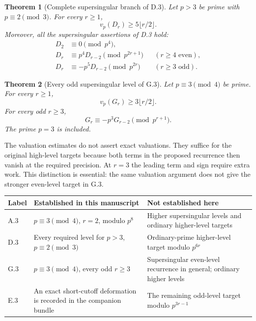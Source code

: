 \documentclass[11pt,letterpaper]{article}
\newtheorem{theorem}{Theorem}[section]
\numberwithin{equation}{section}
\begin{document}
\begin{theorem}[Complete supersingular branch of D.3]\label{IV-main:D}
Let $p>3$ be prime with $p\equiv2\pmod3$. For every $r\ge1$,
\[
 v_p(D_r)\ge5\lfloor r/2\rfloor.
\]
Moreover, all the supersingular assertions of D.3 hold:
\begin{align*}
 D_2&\equiv0\pmod{p^4},\\
 D_r&\equiv p^4D_{r-2}\pmod{p^{2r+1}}
       &&(r\ge4\text{ even}),\\
 D_r&\equiv-p^5D_{r-2}\pmod{p^{2r}}
       &&(r\ge3\text{ odd}).
\end{align*}
\end{theorem}

\begin{theorem}[Every odd supersingular level of G.3]\label{IV-main:G}
Let $p\equiv3\pmod4$ be prime. For every $r\ge1$,
\[
 v_p(G_r)\ge3\lfloor r/2\rfloor.
\]
For every odd $r\ge3$,
\[
 G_r\equiv-p^3G_{r-2}\pmod{p^{r+1}}.
\]
The prime $p=3$ is included.
\end{theorem}

The valuation estimates do not assert exact valuations. They suffice
for the original high-level targets because both terms in the proposed
recurrence then vanish at the required precision. At $r=3$ the leading
term and sign require extra work. This distinction is essential: the
same valuation argument does not give the stronger even-level target
in G.3.

\begin{center}
\small
\begin{tabular}{@{}p{.08\linewidth}p{.42\linewidth}p{.43\linewidth}@{}}
\toprule
Label & Established in this manuscript & Not established here \\
\midrule
A.3 & $p\equiv3\pmod4$, $r=2$, modulo $p^8$
& Higher supersingular levels and ordinary higher-level targets \\[3pt]
D.3 & Every required level for $p>3$, $p\equiv2\pmod3$
& Ordinary-prime higher-level target modulo $p^{6r}$ \\[3pt]
G.3 & $p\equiv3\pmod4$, every odd $r\ge3$
& Supersingular even-level recurrence in general; ordinary higher levels \\[3pt]
E.3 & An exact short-cutoff deformation is recorded in the companion bundle
& The remaining odd-level target modulo $p^{3r-1}$ \\
\bottomrule
\end{tabular}
\end{center}
\end{document}
